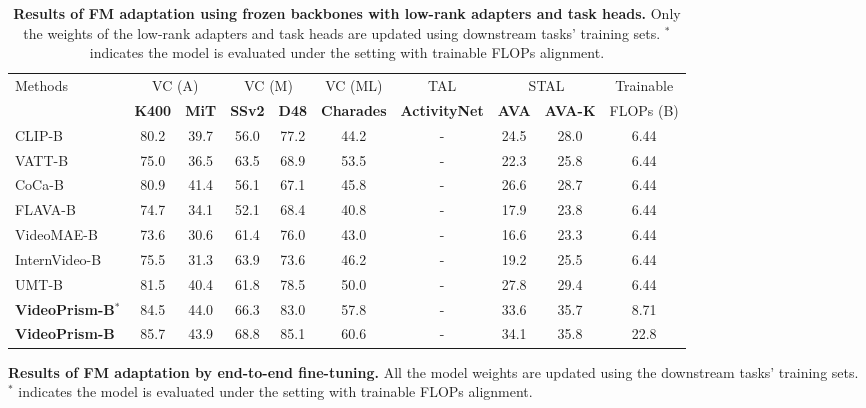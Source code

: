 \documentclass{article}
\theoremstyle{plain}
\theoremstyle{definition}
\theoremstyle{remark}
\newcommand{\OURS}{VideoPrism\xspace}
\begin{document}
\begin{table}
\caption{
\textbf{Results of FM adaptation using frozen backbones with low-rank adapters and task heads.}
Only the weights of the low-rank adapters and task heads are updated using downstream tasks' training sets.
$^{\ast}$ indicates the model is evaluated under the setting with trainable FLOPs alignment.
}
\label{tbl:videoglue_adpt}
\begin{center}
\begin{scriptsize}
\begin{tabular}{@{}l|cc|cc|c|c|cc|c@{}} 
\toprule
\multirow{2}{*}{Methods} & \multicolumn{2}{c|}{VC (A)} & \multicolumn{2}{c|}{VC (M)} & VC (ML) & TAL & \multicolumn{2}{c|}{STAL} & Trainable \\
& \textbf{K400} & \textbf{MiT} & \textbf{SSv2} & \textbf{D48} & \textbf{Charades} & \textbf{ActivityNet} & \textbf{AVA} & \textbf{AVA-K} & FLOPs (B) \\
\midrule
CLIP-B~\cite{radford2021learning} & 80.2 & 39.7 & 56.0 & 77.2 & 44.2 & - & 24.5 & 28.0 & 6.44 \\
VATT-B~\cite{akbari2021vatt} & 75.0 & 36.5 & 63.5 & 68.9 & 53.5 & - & 22.3 & 25.8 & 6.44 \\
CoCa-B~\cite{yu2022coca} & 80.9 & 41.4 & 56.1 & 67.1 & 45.8 & - & 26.6 & 28.7 & 6.44 \\
FLAVA-B~\cite{singh2022flava} & 74.7 & 34.1 & 52.1 & 68.4 & 40.8 & - & 17.9 & 23.8 & 6.44 \\
VideoMAE-B~\cite{tong2022videomae} & 73.6 & 30.6 & 61.4 & 76.0 & 43.0 & - & 16.6 & 23.3 & 6.44 \\
InternVideo-B~\cite{wang2022internvideo} & 75.5 & 31.3 & 63.9 & 73.6 & 46.2 & - & 19.2 & 25.5 & 6.44 \\
UMT-B~\cite{li2023unmasked} & 81.5 & 40.4 & 61.8 & 78.5 & 50.0 & - & 27.8 & 29.4 & 6.44 \\
\textbf{\OURS-B}$^{\ast}$ & 84.5 & 44.0 & 66.3 & 83.0 & 57.8 & - & 33.6 & 35.7 & 8.71 \\
\textbf{\OURS-B} & 85.7 & 43.9 & 68.8 & 85.1 & 60.6 & - & 34.1 & 35.8 & 22.8 \\
\bottomrule
\end{tabular}
\end{scriptsize}
\end{center}
\vskip -0.1in
\end{table} \begin{table}
\caption{
\textbf{Results of FM adaptation by end-to-end fine-tuning.}
All the model weights are updated using the downstream tasks' training sets.
$^{\ast}$ indicates the model is evaluated under the setting with trainable FLOPs alignment.
}
\end{table}
\end{document}
